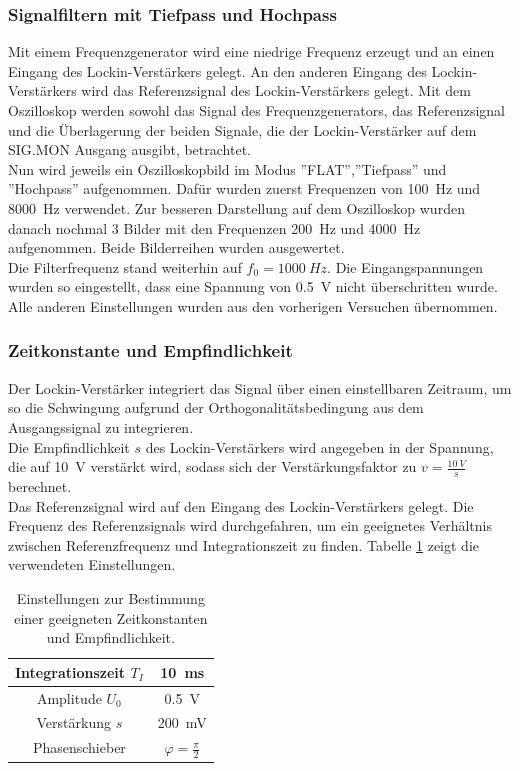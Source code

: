 \documentclass[12pt,a4paper]{article}
\begin{document}
\subsubsection{Signalfiltern mit Tiefpass und Hochpass}
Mit einem Frequenzgenerator wird eine niedrige Frequenz erzeugt und an einen Eingang des Lockin-Verstärkers gelegt. An den anderen Eingang des Lockin-Verstärkers wird das Referenzsignal des Lockin-Verstärkers gelegt. Mit dem Oszilloskop werden sowohl das Signal des Frequenzgenerators, das Referenzsignal und die Überlagerung der beiden Signale, die der Lockin-Verstärker auf dem SIG.MON Ausgang ausgibt, betrachtet.\\
Nun wird jeweils ein Oszilloskopbild im Modus ''FLAT'',''Tiefpass'' und ''Hochpass'' aufgenommen. Dafür wurden zuerst Frequenzen von \SI{100}{Hz} und \SI{8000}{Hz} verwendet. Zur besseren Darstellung auf dem Oszilloskop wurden danach nochmal 3 Bilder mit den Frequenzen \SI{200}{Hz} und \SI{4000}{Hz} aufgenommen. Beide Bilderreihen wurden ausgewertet.\\
Die Filterfrequenz stand weiterhin auf $f_0 = \SI{1000}{Hz}$. Die Eingangspannungen wurden so eingestellt, dass eine Spannung von \SI{0,5}{V} nicht überschritten wurde. Alle anderen Einstellungen wurden aus den vorherigen Versuchen übernommen.

\subsubsection{Zeitkonstante und Empfindlichkeit}
Der Lockin-Verstärker integriert das Signal über einen einstellbaren Zeitraum, um so die Schwingung aufgrund der Orthogonalitätsbedingung aus dem Ausgangssignal zu integrieren. \\
Die Empfindlichkeit $s$ des Lockin-Verstärkers wird angegeben in der Spannung, die auf \SI{10}{V} verstärkt wird, sodass sich der Verstärkungsfaktor zu $v = \frac{\SI{10}{V}}{s}$ berechnet. \\
Das Referenzsignal wird auf den Eingang des Lockin-Verstärkers gelegt. Die Frequenz des Referenzsignals wird durchgefahren, um ein geeignetes Verhältnis zwischen Referenzfrequenz und Integrationszeit zu finden. Tabelle \ref{tab:Zeitkonst_Einstellungen} zeigt die verwendeten Einstellungen.

\begin{table}[H]
\centering
\begin{tabular}{|c|c|}
\hline 
Integrationszeit $T_I$ & \SI{10}{ms} \\ 
\hline 
Amplitude $U_0$ & \SI{0,5}{V} \\
\hline 
Verstärkung $s$ & \SI{200}{mV} \\ 
\hline 
Phasenschieber & $\varphi = \frac{\pi}{2}$ \\ 
\hline 
\end{tabular} 
\caption{Einstellungen zur Bestimmung einer geeigneten Zeitkonstanten und Empfindlichkeit.}
\label{tab:Zeitkonst_Einstellungen}
\end{table}
\end{document}
